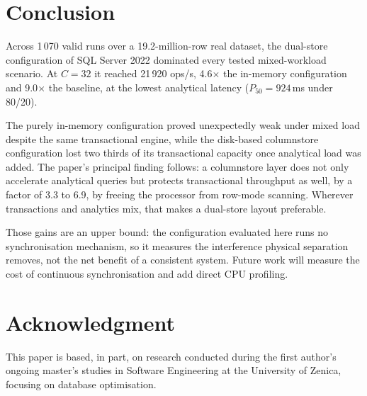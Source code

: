 \documentclass[10pt,conference,a4paper]{IEEEtran}
\begin{document}
\section{Conclusion}
Across 1\,070 valid runs over a 19.2-million-row real dataset, the dual-store
configuration of SQL Server 2022 dominated every tested mixed-workload
scenario. At $C = 32$ it reached 21\,920 ops/s, 4.6$\times$ the in-memory
configuration and 9.0$\times$ the baseline, at the lowest analytical latency
($P_{50} = 924$\,ms under 80/20).

The purely in-memory configuration proved unexpectedly weak under mixed load
despite the same transactional engine, while the disk-based columnstore
configuration lost two thirds of its transactional capacity once analytical
load was added. The paper's principal finding follows: a columnstore layer
does not only accelerate analytical queries but protects transactional
throughput as well, by a factor of 3.3 to 6.9, by freeing the processor from
row-mode scanning. Wherever transactions and analytics mix, that makes a dual-store layout
preferable.

Those gains are an upper bound: the configuration evaluated here runs no
synchronisation mechanism, so it measures the interference physical
separation removes, not the net benefit of a consistent system. Future work
will measure the cost of continuous synchronisation and add direct CPU
profiling.

\section*{Acknowledgment}
This paper is based, in part, on research conducted during the first
author's ongoing master's studies in Software Engineering at the University
of Zenica, focusing on database optimisation.

\balance



\end{document}
